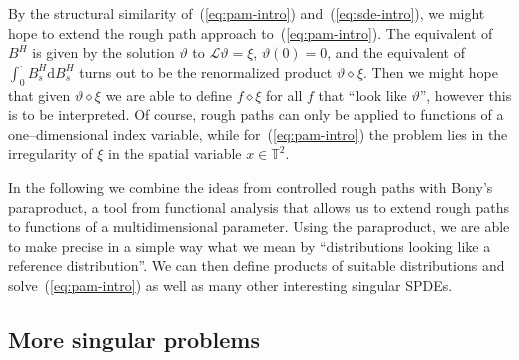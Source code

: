 \documentclass[a4paper,11pt]{article}
\newcommand{\mathd}{\mathrm{d}}
\newcommand{\LL}{\mathscr{L}}
\newcommand{\renorm}{\,\mathord{\diamond}\,}
\begin{document}
By the structural similarity of~(\ref{eq:pam-intro}) and~(\ref{eq:sde-intro}),
we might hope to extend the rough path approach to~(\ref{eq:pam-intro}). The
equivalent of $B^H$ is given by the solution $\vartheta$ to $\LL \vartheta =
\xi$, $\vartheta (0) = 0$, and the equivalent of $\int_0^{\cdot} B^H_s
\mathd B^H_s$ turns out to be the renormalized product
$\vartheta \renorm \xi$. Then we might hope that given $\vartheta \renorm \xi$ we are able to define $f \renorm
\xi$ for all $f$ that ``look like $\vartheta$'', however this is to be
interpreted. Of course, rough paths can only be applied to functions of a
one--dimensional index variable, while for~(\ref{eq:pam-intro}) the problem
lies in the irregularity of $\xi$ in the spatial variable $x \in
\mathbb{T}^2$.

In the following we combine the ideas from controlled rough paths with Bony's
paraproduct, a tool from functional analysis that allows us to extend rough paths to
functions of a multidimensional parameter. Using the paraproduct, we are able
to make precise in a simple way what we mean by ``distributions looking like a
reference distribution''. We can then define products of suitable
distributions and solve~(\ref{eq:pam-intro}) as well as many other interesting
singular SPDEs.

\subsection{More singular problems}\label{sec:rbe,kpz,she}
\end{document}
